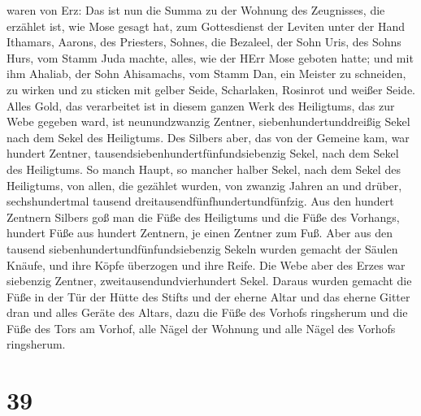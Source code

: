 waren von Erz:  Das ist nun die Summa zu der Wohnung des
Zeugnisses, die erzählet ist, wie Mose gesagt hat, zum Gottesdienst der
Leviten unter der Hand Ithamars, Aarons, des Priesters, Sohnes,
 die Bezaleel, der Sohn Uris, des Sohns Hurs, vom Stamm
Juda machte, alles, wie der HErr Mose geboten hatte;  und
mit ihm Ahaliab, der Sohn Ahisamachs, vom Stamm Dan, ein Meister zu
schneiden, zu wirken und zu sticken mit gelber Seide, Scharlaken,
Rosinrot und weißer Seide.  Alles Gold, das verarbeitet ist
in diesem ganzen Werk des Heiligtums, das zur Webe gegeben ward, ist
neunundzwanzig Zentner, siebenhundertunddreißig Sekel nach dem Sekel des
Heiligtums.  Des Silbers aber, das von der Gemeine kam, war
hundert Zentner, tausendsiebenhundertfünfundsiebenzig Sekel, nach dem
Sekel des Heiligtums.  So manch Haupt, so mancher halber
Sekel, nach dem Sekel des Heiligtums, von allen, die gezählet wurden,
von zwanzig Jahren an und drüber, sechshundertmal tausend
dreitausendfünfhundertundfünfzig.  Aus den hundert Zentnern
Silbers goß man die Füße des Heiligtums und die Füße des Vorhangs,
hundert Füße aus hundert Zentnern, je einen Zentner zum Fuß.
 Aber aus den tausend siebenhundertundfünfundsiebenzig
Sekeln wurden gemacht der Säulen Knäufe, und ihre Köpfe überzogen und
ihre Reife.  Die Webe aber des Erzes war siebenzig Zentner,
zweitausendundvierhundert Sekel.  Daraus wurden gemacht die
Füße in der Tür der Hütte des Stifts und der eherne Altar und das eherne
Gitter dran und alles Geräte des Altars,  dazu die Füße des
Vorhofs ringsherum und die Füße des Tors am Vorhof, alle Nägel der
Wohnung und alle Nägel des Vorhofs ringsherum.

\hypertarget{section-38}{%
\section{39}\label{section-38}}

